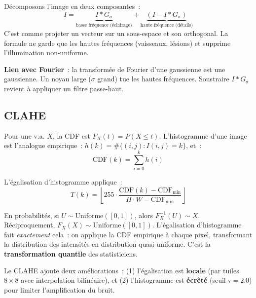 \documentclass[11pt,a4paper]{article}
\begin{document}
\begin{intubox}
D\'ecomposons l'image en deux composantes~:
\[
I = \underbrace{I * G_\sigma}_{\text{basse fr\'equence (\'eclairage)}} + \underbrace{(I - I*G_\sigma)}_{\text{haute fr\'equence (d\'etails)}}
\]
C'est comme projeter un vecteur sur un sous-espace et son orthogonal. La formule ne garde que les hautes fr\'equences (vaisseaux, l\'esions) et supprime l'illumination non-uniforme.

\textbf{Lien avec Fourier}~: la transform\'ee de Fourier d'une gaussienne est une gaussienne. Un noyau large ($\sigma$ grand) tue les hautes fr\'equences. Soustraire $I*G_\sigma$ revient \`a appliquer un filtre passe-haut.
\end{intubox}

\subsection{CLAHE}

\begin{rappelbox}
Pour une v.a. $X$, la CDF est $F_X(t) = P(X \leq t)$. L'histogramme d'une image est l'analogue empirique~: $h(k) = \#\{(i,j) : I(i,j) = k\}$, et~:
\[
\text{CDF}(k) = \sum_{i=0}^{k} h(i)
\]
\end{rappelbox}

L'\'egalisation d'histogramme applique~:
\begin{equation}
  T(k) = \left\lfloor 255 \cdot \frac{\text{CDF}(k) - \text{CDF}_{\min}}{H \cdot W - \text{CDF}_{\min}} \right\rfloor
\end{equation}

\begin{intubox}
En probabilit\'es, si $U \sim \text{Uniforme}([0,1])$, alors $F_X^{-1}(U) \sim X$. R\'eciproquement, $F_X(X) \sim \text{Uniforme}([0,1])$. L'\'egalisation d'histogramme fait \emph{exactement} cela~: on applique la CDF empirique \`a chaque pixel, transformant la distribution des intensit\'es en distribution quasi-uniforme. C'est la \textbf{transformation quantile} des statisticiens.
\end{intubox}

Le CLAHE ajoute deux am\'eliorations~: (1) l'\'egalisation est \textbf{locale} (par tuiles $8 \times 8$ avec interpolation bilin\'eaire), et (2) l'histogramme est \textbf{\'ecr\^et\'e} (seuil $\tau = 2.0$) pour limiter l'amplification du bruit.
\end{document}
